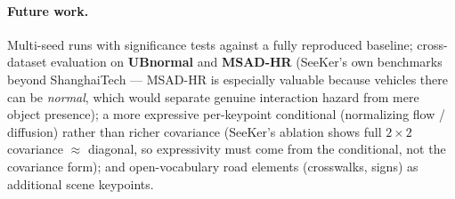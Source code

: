 \documentclass{article}
\begin{document}
\paragraph{Future work.}
Multi-seed runs with significance tests against a fully reproduced baseline;
cross-dataset evaluation on \textbf{UBnormal} and \textbf{MSAD-HR} (SeeKer's own
benchmarks beyond ShanghaiTech --- MSAD-HR is especially valuable because
vehicles there can be \emph{normal}, which would separate genuine interaction
hazard from mere object presence); a more expressive per-keypoint conditional
(normalizing flow / diffusion) rather than richer covariance (SeeKer's ablation
shows full $2{\times}2$ covariance $\approx$ diagonal, so expressivity must come
from the conditional, not the covariance form); and open-vocabulary road
elements (crosswalks, signs) as additional scene keypoints.
\end{document}
